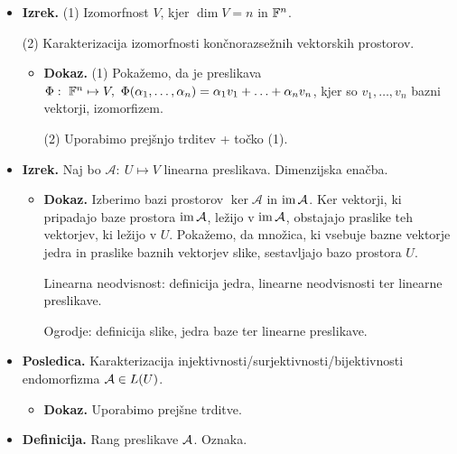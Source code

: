 \begin{enumerate}
\begin{itemize}
\begin{itemize}
            (2) Definicija in opis ogrodja + definicija surjektivne preslikave.
        \end{itemize}
        \item \colorbox{blue!30}{\textbf{Izrek.}} (1) Izomorfnost $V$, kjer $\dim V = n$ in $\mathbb{F}^n$. 
        
        (2) Karakterizacija izomorfnosti končnorazsežnih vektorskih prostorov.        
        \begin{itemize}
            \item \colorbox{green!30}{\textbf{Dokaz.}} (1) Pokažemo, da je preslikava $\Phi: \ \mathbb{F}^n \mapsto V, \ \Phi(\alpha_1, \ldots, \alpha_n) = \alpha_1 v_1 + \ldots + \alpha_n v_n$, kjer so $v_1, \ldots, v_n$ bazni vektorji, izomorfizem.
            
            (2) Uporabimo prejšnjo trditev + točko (1).
        \end{itemize}
        \item \colorbox{blue!30}{\textbf{Izrek.}} Naj bo $\mathcal{A}: \ U \mapsto V$ linearna preslikava. Dimenzijska enačba.
        \begin{itemize}
            \item \colorbox{green!30}{\textbf{Dokaz.}} Izberimo bazi prostorov $\ker \mathcal{A}$ in $\operatorname{im} \mathcal{A}$. Ker vektorji, ki pripadajo baze prostora $\operatorname{im} \mathcal{A}$, ležijo v $\operatorname{im} \mathcal{A}$, obstajajo praslike teh vektorjev, ki ležijo v $U$. Pokažemo, da množica, ki vsebuje bazne vektorje jedra in praslike baznih vektorjev slike, sestavljajo bazo prostora $U$.
            
            Linearna neodvisnost: definicija jedra, linearne neodvisnosti ter linearne preslikave.

            Ogrodje: definicija slike, jedra baze ter linearne preslikave.
        \end{itemize}
        \item \colorbox{orange!30}{\textbf{Posledica.}} Karakterizacija injektivnosti/surjektivnosti/bijektivnosti endomorfizma $\mathcal{A} \in L(U)$.
        \begin{itemize}
            \item \colorbox{green!30}{\textbf{Dokaz.}} Uporabimo prejšne trditve.
        \end{itemize}
        \item \colorbox{purple!30}{\textbf{Definicija.}} Rang preslikave $\mathcal{A}$. Oznaka.
    \end{itemize}


\end{enumerate}

